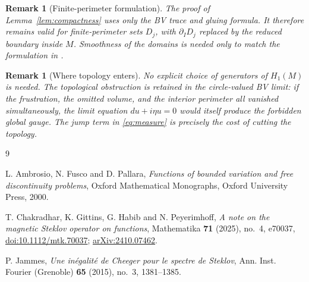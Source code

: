 \documentclass[11pt]{amsart}
\newtheorem{remark}[theorem]{Remark}
\begin{document}
\begin{remark}[Finite-perimeter formulation]
The proof of Lemma~\ref{lem:compactness} uses only the BV trace and gluing
formula.  It therefore remains valid for finite-perimeter sets $D_j$, with
$\partial_I D_j$ replaced by the reduced boundary inside $M$.  Smoothness of
the domains is needed only to match the formulation in \cite{CGHP}.
\end{remark}

\begin{remark}[Where topology enters]
No explicit choice of generators of $H_1(M)$ is needed.  The topological
obstruction is retained in the circle-valued BV limit: if the frustration,
the omitted volume, and the interior perimeter all vanished simultaneously,
the limit equation $du+i\eta u=0$ would itself produce the forbidden global
gauge.  The jump term in \eqref{eq:measure} is precisely the cost of cutting
the topology.
\end{remark}

\begin{thebibliography}{9}

L. Ambrosio, N. Fusco and D. Pallara,
\emph{Functions of bounded variation and free discontinuity problems},
Oxford Mathematical Monographs, Oxford University Press, 2000.

T. Chakradhar, K. Gittins, G. Habib and N. Peyerimhoff,
\emph{A note on the magnetic Steklov operator on functions},
Mathematika \textbf{71} (2025), no.~4, e70037,
\href{https://doi.org/10.1112/mtk.70037}{doi:10.1112/mtk.70037};
\href{https://arxiv.org/abs/2410.07462}{arXiv:2410.07462}.

P. Jammes,
\emph{Une in\'egalit\'e de Cheeger pour le spectre de Steklov},
Ann. Inst. Fourier (Grenoble) \textbf{65} (2015), no.~3, 1381--1385.

\end{thebibliography}
\end{document}
